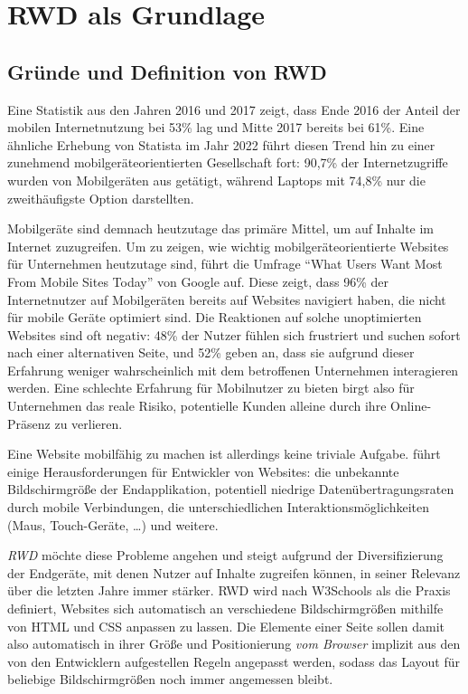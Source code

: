 \section{\ac{RWD} als Grundlage}\label{sec:responsive-webdesign-rwd-als-grundlage}

\subsection{Gründe und Definition von \ac{RWD}}\label{subsec:grunde-und-definition-von-rwd}

Eine Statistik aus den Jahren 2016 und 2017 \autocite{statista.GWI.2017} zeigt, dass Ende 2016 der Anteil der mobilen Internetnutzung bei 53\% lag und Mitte 2017 bereits bei 61\%.
Eine ähnliche Erhebung von Statista \autocite{statista.DataReportal.WeAreSocial.Hootsuite.2023} im Jahr 2022 führt diesen Trend hin zu einer zunehmend mobilgeräteorientierten Gesellschaft fort:
90,7\% der Internetzugriffe wurden von Mobilgeräten aus getätigt, während Laptops mit 74,8\% nur die zweithäufigste Option darstellten.

Mobilgeräte sind demnach heutzutage das primäre Mittel, um auf Inhalte im Internet zuzugreifen.
Um zu zeigen, wie wichtig mobilgeräteorientierte Websites für Unternehmen heutzutage sind, führt \autocite[S. 25]{Harmsen.2018} die Umfrage "`What Users Want Most From Mobile Sites Today"' von Google \autocite{Google.WhatUsersWantFromMobile.2012} auf.
Diese zeigt, dass 96\% der Internetnutzer auf Mobilgeräten bereits auf Websites navigiert haben, die nicht für mobile Geräte optimiert sind.
Die Reaktionen auf solche unoptimierten Websites sind oft negativ: 48\% der Nutzer fühlen sich frustriert und suchen sofort nach einer alternativen Seite, und 52\% geben an, dass sie aufgrund dieser Erfahrung weniger wahrscheinlich mit dem betroffenen Unternehmen interagieren werden.
Eine schlechte Erfahrung für Mobilnutzer zu bieten birgt also für Unternehmen das reale Risiko, potentielle Kunden alleine durch ihre Online-Präsenz zu verlieren.

Eine Website mobilfähig zu machen ist allerdings keine triviale Aufgabe.
\autocite[S. 25-33]{Harmsen.2018} führt einige Herausforderungen für Entwickler von Websites:
die unbekannte Bildschirmgröße der Endapplikation, potentiell niedrige Datenübertragungsraten durch mobile Verbindungen, die unterschiedlichen Interaktionsmöglichkeiten (Maus, Touch-Geräte, \ldots) und weitere.

\emph{\acl{RWD}} möchte diese Probleme angehen und steigt aufgrund der Diversifizierung der Endgeräte, mit denen Nutzer auf Inhalte zugreifen können, in seiner Relevanz über die letzten Jahre immer stärker.
\ac{RWD} wird nach W3Schools \autocite{W3Schools.ResponsiveWebDesign.2024} als die Praxis definiert, Websites sich automatisch an verschiedene Bildschirmgrößen mithilfe von \ac{HTML} und \ac{CSS} anpassen zu lassen.
Die Elemente einer Seite sollen damit also automatisch in ihrer Größe und Positionierung \emph{vom Browser} implizit aus den von den Entwicklern aufgestellen Regeln angepasst werden, sodass das Layout für beliebige Bildschirmgrößen noch immer angemessen bleibt.

